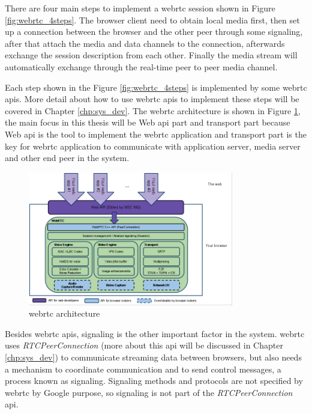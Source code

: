 \noindent There are four main steps to implement a \gls{webrtc} session shown in Figure \ref{fig:webrtc_4steps}. The browser client need to obtain local media first, then set up a connection between the browser and the other peer through some signaling, after that attach the media and data channels to the connection, afterwards exchange the session description from each other. Finally the media stream will automatically exchange through the real-time peer to peer media channel.

\par Each step shown in the Figure \ref{fig:webrtc_4steps} is implemented by some \gls{webrtc} \gls{api}s. More detail about how to use \gls{webrtc} \gls{api}s to implement these steps will be covered in Chapter \ref{chp:sys_dev}. The \gls{webrtc} architecture is shown in Figure \ref{fig:webrtc_api_arch}, the main focus in this thesis will be Web \gls{api} part and transport part because Web \gls{api} is the tool to implement the \gls{webrtc} application and transport part is the key for \gls{webrtc} application to communicate with application server, media server and other end peer in the system. 

\begin{figure}
	\centering
    	\includegraphics[width=0.80\textwidth,natwidth=610,natheight=642]{figs/WebRTCapiPic.png}
  	\caption{\gls{webrtc} architecture \cite{org:webrtc}}
  	\label{fig:webrtc_api_arch}
\end{figure}

\par Besides \gls{webrtc} \gls{api}s, signaling is the other important factor in the system. \gls{webrtc} uses \textit{RTCPeerConnection} (more about this \gls{api} will be discussed in Chapter \ref{chp:sys_dev}) to communicate streaming data between browsers, but also needs a mechanism to coordinate communication and to send control messages, a process known as signaling. Signaling methods and protocols are not specified by \gls{webrtc} by Google purpose, so signaling is not part of the \textit{RTCPeerConnection} \gls{api}.

